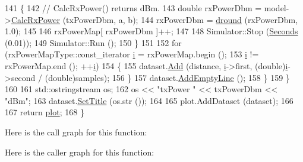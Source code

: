 \begin{DoxyCode}
141           \{
142             \textcolor{comment}{// CalcRxPower() returns dBm.}
143             \textcolor{keywordtype}{double} rxPowerDbm = model->\hyperlink{classns3_1_1PropagationLossModel_a8b42564e9b03e2197f17aab6692c4fee}{CalcRxPower} (txPowerDbm, a, b);
144             rxPowerDbm = \hyperlink{main-propagation-loss_8cc_a721898091040fc1467f1dca3e57edd12}{dround} (rxPowerDbm, 1.0);
145 
146             rxPowerMap[ rxPowerDbm ]++;
147 
148             Simulator::Stop (\hyperlink{group__timecivil_ga33c34b816f8ff6628e33d5c8e9713b9e}{Seconds} (0.01));
149             Simulator::Run ();
150           \}
151 
152         \textcolor{keywordflow}{for} (rxPowerMapType::const\_iterator \hyperlink{bernuolliDistribution_8m_a6f6ccfcf58b31cb6412107d9d5281426}{i} = rxPowerMap.begin ();
153              \hyperlink{bernuolliDistribution_8m_a6f6ccfcf58b31cb6412107d9d5281426}{i} != rxPowerMap.end (); ++\hyperlink{bernuolliDistribution_8m_a6f6ccfcf58b31cb6412107d9d5281426}{i})
154           \{
155             dataset.\hyperlink{classns3_1_1Gnuplot3dDataset_ad3a4b4baa637cfc099a488f3fcbf1975}{Add} (distance, \hyperlink{bernuolliDistribution_8m_a6f6ccfcf58b31cb6412107d9d5281426}{i}->first, (\textcolor{keywordtype}{double})\hyperlink{bernuolliDistribution_8m_a6f6ccfcf58b31cb6412107d9d5281426}{i}->second / (\textcolor{keywordtype}{double})samples);
156           \}
157         dataset.\hyperlink{classns3_1_1Gnuplot3dDataset_a0a56512b7f6c6c75622a3981c69c07ec}{AddEmptyLine} ();
158       \}
159   \}
160 
161   std::ostringstream os;
162   os << \textcolor{stringliteral}{"txPower "} << txPowerDbm << \textcolor{stringliteral}{"dBm"};
163   dataset.\hyperlink{classns3_1_1GnuplotDataset_add68db1296fcadff7255633c0df96e08}{SetTitle} (os.str ());
164 
165   plot.AddDataset (dataset);
166 
167   \textcolor{keywordflow}{return} \hyperlink{lte__amc_8m_a5942306abe9f005572e4344e3cdef528}{plot};
168 \}
\end{DoxyCode}


Here is the call graph for this function\+:




Here is the caller graph for this function\+:


